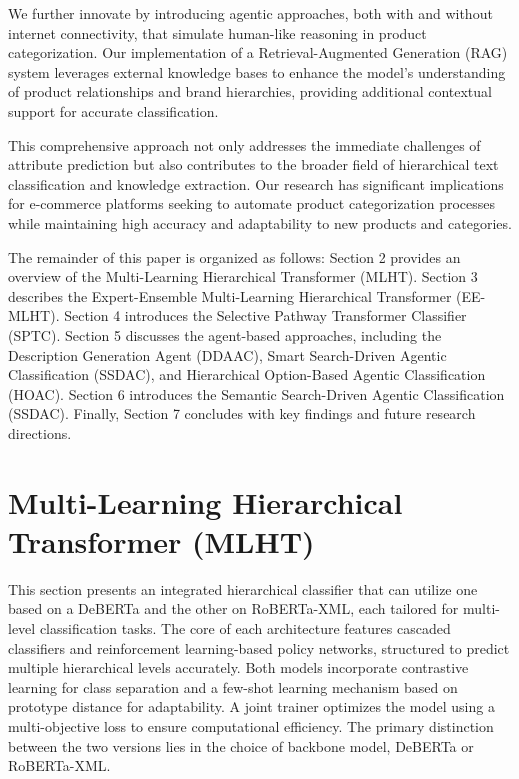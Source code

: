 \documentclass[9pt,a4paper,twoside]{rho-class/rho}
\begin{document}
    We further innovate by introducing agentic approaches, both with and without internet connectivity, that simulate human-like reasoning in product categorization. Our implementation of a Retrieval-Augmented Generation (RAG) system leverages external knowledge bases to enhance the model's understanding of product relationships and brand hierarchies, providing additional contextual support for accurate classification.
    
    This comprehensive approach not only addresses the immediate challenges of attribute prediction but also contributes to the broader field of hierarchical text classification and knowledge extraction. Our research has significant implications for e-commerce platforms seeking to automate product categorization processes while maintaining high accuracy and adaptability to new products and categories.
    
    The remainder of this paper is organized as follows: Section 2 provides an overview of the Multi-Learning Hierarchical Transformer (MLHT). Section 3 describes the Expert-Ensemble Multi-Learning Hierarchical Transformer (EE-MLHT). Section 4 introduces the Selective Pathway Transformer Classifier (SPTC). Section 5 discusses the agent-based approaches, including the Description Generation Agent (DDAAC), Smart Search-Driven Agentic Classification (SSDAC), and Hierarchical Option-Based Agentic Classification (HOAC). Section 6 introduces the Semantic Search-Driven Agentic Classification (SSDAC). Finally, Section 7 concludes with key findings and future research directions.

\section{Multi-Learning Hierarchical Transformer (MLHT)}

   This section presents an integrated hierarchical classifier that can utilize one based on a DeBERTa and the other on RoBERTa-XML, each tailored for multi-level classification tasks. The core of each architecture features cascaded classifiers and reinforcement learning-based policy networks, structured to predict multiple hierarchical levels accurately. Both models incorporate contrastive learning for class separation and a few-shot learning mechanism based on prototype distance for adaptability. A joint trainer optimizes the model using a multi-objective loss to ensure computational efficiency. The primary distinction between the two versions lies in the choice of backbone model, DeBERTa or RoBERTa-XML.
\end{document}
